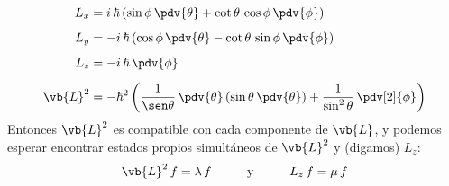 \begin{align}
L_{x} &= i \, \hbar \left( \sin \phi \, \pdv{\theta} + \cot \theta \, \cos \phi \, \pdv{\phi} \right) \label{eq:ecuacion_05_16} \\[0.5em]
L_{y} &= - i \, \hbar \left( \cos \phi \, \pdv{\theta} - \cot \theta \, \sin \phi \, \pdv{\phi} \right) \label{eq:ecuacion_05_17} \\[0.5em]
L_{z} &= - i \, \hbar \, \pdv{\phi} \label{eq:ecuacion_05_18} \\[0.5em]
\vb{L}^{2} &= - \hbar^{2} \left( \dfrac{1}{\sen \theta} \, \pdv{\theta} \left( \sin \theta \, \pdv{\theta} \right) + \dfrac{1}{\sin^{2} \theta} \, \pdv[2]{\phi} \right) \label{eq:ecuacion_05_19}
\end{align}
Entonces $\vb{L}^{2}$ es compatible con cada componente de $\vb{L}$, y podemos esperar encontrar estados propios simultáneos de $\vb{L}^{2}$ y (digamos) $L_{z}$:
\begin{align}
\vb{L}^{2} \, f = \lambda \, f \hspace{1cm} \mbox{y} \hspace{1cm} L_{z} \, f = \mu \, f
\label{eq:ecuacion_04_104}
\end{align}
